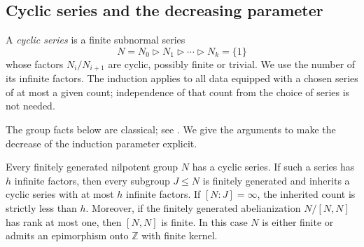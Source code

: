 \subsection{Cyclic series and the decreasing parameter}

A \emph{cyclic series} is a finite subnormal series
\[
 N=N_0\triangleright N_1\triangleright\cdots\triangleright N_k=\{1\}
\]
whose factors $N_i/N_{i+1}$ are cyclic, possibly finite or trivial.
We use the number of its infinite factors. The induction applies to
all data equipped with a chosen series of at most a given count;
independence of that count from the choice of series is not needed.

The group facts below are classical; see
\cite[Theorems~5.2.5 and~5.2.18]{Robinson1996}.
We give the arguments to make the decrease of the induction parameter
explicit.

\begin{lemma}
\label{lem:rank}
Every finitely generated nilpotent group $N$ has a cyclic series.
If such a series has $h$ infinite factors, then every subgroup $J\le N$
is finitely generated and inherits a cyclic series with at most $h$
infinite factors. If $[N:J]=\infty$, the inherited count is strictly
less than $h$.
Moreover, if the finitely generated abelianization $N/[N,N]$ has rank
at most one, then $[N,N]$ is finite. In this case $N$ is either finite
or admits an epimorphism onto $\mathbb Z$ with finite kernel.
\end{lemma}

